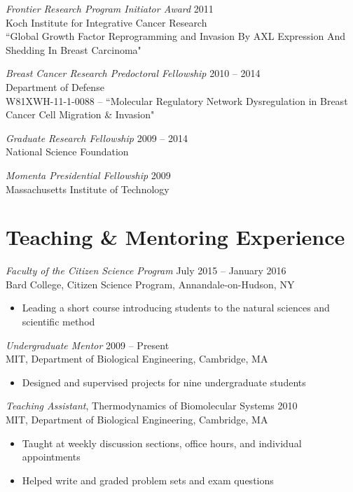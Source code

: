 \documentclass[11pt]{res}
\begin{document}
\begin{resume}
{\sl Frontier Research Program Initiator Award} \hfill 2011 \\
Koch Institute for Integrative Cancer Research\\
``Global Growth Factor Reprogramming and Invasion By AXL Expression And Shedding In Breast Carcinoma"

{\sl Breast Cancer Research Predoctoral Fellowship} \hfill 2010 -- 2014 \\
Department of Defense\\
W81XWH-11-1-0088 -- ``Molecular Regulatory Network Dysregulation in Breast Cancer Cell Migration \& Invasion"

{\sl Graduate Research Fellowship}  \hfill 2009 -- 2014 \\
National Science Foundation

{\sl Momenta Presidential Fellowship} \hfill 2009 \\
Massachusetts Institute of Technology



\section{Teaching \& Mentoring Experience}

{\sl Faculty of the Citizen Science Program} \hfill July 2015 -- January 2016 \\
Bard College, Citizen Science Program, Annandale-on-Hudson, NY	
\begin{itemize} \itemsep -2pt %
\item Leading a short course introducing students to the natural sciences and scientific method
\end{itemize}

{\sl Undergraduate Mentor} \hfill 2009 -- Present \\
MIT, Department of Biological Engineering, Cambridge, MA
\begin{itemize} \itemsep -2pt %
\item Designed and supervised projects for nine undergraduate students
\end{itemize}
	

{\sl Teaching Assistant}, Thermodynamics of Biomolecular Systems \hfill 2010 \\
MIT, Department of Biological Engineering, Cambridge, MA
\begin{itemize} \itemsep -2pt %
\item Taught at weekly discussion sections, office hours, and individual appointments
\item Helped write and graded problem sets and exam questions
\end{itemize}





\end{resume}
\end{document}

